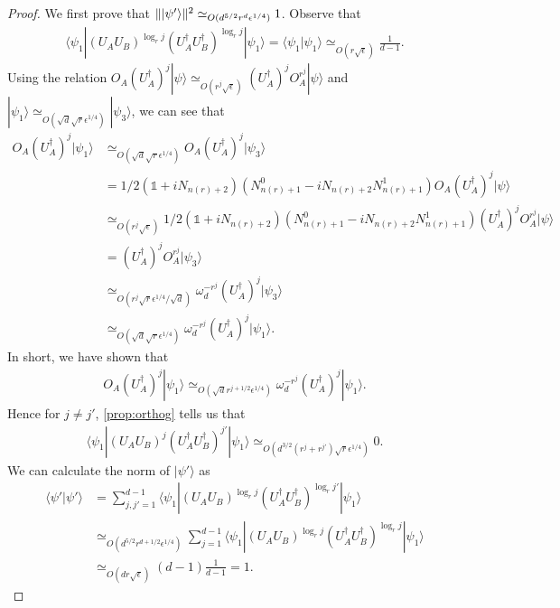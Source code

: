\documentclass[11pt,letterpaper]{article}
\newcommand{\ket}[1]{|#1\rangle}
\newcommand{\bra}[1]{\langle#1|}
\newcommand{\braket}[2]{\langle#1|#2\rangle}
\newcommand{\ct}{^{\dagger}}
\DeclarePairedDelimiter{\norm}{\lVert}{\rVert}
\newcommand{\1}{\mathbb{1}}
\newcommand{\nr}{n(r)}
\newcommand{\se}{\sqrt{\epsilon}}
\newcommand{\qe}{\epsilon^{1/4}}
\newcommand{\sd}{\sqrt{d}}
\newcommand{\sr}{\sqrt{r}}
\newcommand{\appd}[1]{\simeq_{#1}}
\theoremstyle{definition}
\begin{document}
\begin{proof}
	We first prove that $\norm{\ket{\psi'}}^2 \appd{O(d^{5/2} r^d \qe)} 1$.
	Observe that 
	\begin{align*}
		\bra{\psi_1} (U_AU_B)^{\log_r j} (U_A\ct U_B\ct)^{\log_r j}  \ket{\psi_1} =
		\braket{\psi_1}{\psi_1} \appd{O(r\se)} \frac{1}{d-1}.
	\end{align*}
	Using the relation $O_A(U_A\ct)^j \ket{\psi} \appd{O(r^j \se)} (U_A\ct)^j O_A^{r^j}\ket{\psi}$ and $\ket{\psi_1} \appd{O(\sd \sr \qe)} \ket{\psi_3}$,
        we can see that 
        \begin{align*}
            	O_A (U_A\ct)^j \ket{\psi_1} &\appd{O(\sd \sr \qe)} O_A(U_A\ct)^j \ket{\psi_3} \\
            	& = 1/2 (\1 + i N_{\nr+2})(N_{\nr+1}^0 - iN_{\nr+2}N_{\nr+1}^1) O_A (U_A\ct)^j \ket{\psi} \\
            	& \appd{O(r^j \se)} 1/2  (\1 + i N_{\nr+2})(N_{\nr+1}^0 - iN_{\nr+2}N_{\nr+1}^1)  (U_A\ct)^j O_A^{r^j} \ket{\psi} \\
            	& = (U_A\ct)^j O_A^{r^j} \ket{\psi_3} \\
            	& \appd{O(r^j \sr \qe/\sd)} \omega_d^{-r^j}(U_A\ct)^j \ket{\psi_3} \\
            	& \appd{O(\sd \sr\qe)} \omega_d^{-r^j}  (U_A\ct)^j \ket{\psi_1}.
        \end{align*}
        In short, we have shown that 
        \begin{align}
        \label{eq:omega}
        		O_A (U_A\ct)^j \ket{\psi_1} \appd{O(\sd r^{j+1/2} \qe)}\omega_d^{-r^j}  (U_A\ct)^j \ket{\psi_1}.
        \end{align}
	Hence for $j \neq j'$, \cref{prop:orthog} tells us that  
	\begin{align*}
		\bra{\psi_1} (U_AU_B)^{j} (U_A\ct U_B\ct)^{ j'} \ket{\psi_1} \appd{O(d^{3/2} (r^j + r^{j'})\sr \qe)} 0.
	\end{align*}
	We can calculate the norm of $\ket{\psi'}$ as 
	\begin{align*}
		\braket{\psi'}{\psi'} &=\sum_{j,j'=1}^{d-1} \bra{\psi_1} (U_AU_B)^{\log_r j} (U_A\ct U_B\ct)^{\log_r j'} \ket{\psi_1}\\
		&\appd{O(d^{5/2} r^{d+1/2} \qe)} \sum_{j=1}^{d-1} \bra{\psi_1} (U_AU_B)^{\log_r j} (U_A\ct U_B\ct)^{\log_r j} \ket{\psi_1}\\
		&\appd{O(dr\se)} (d-1) \frac{1}{d-1} = 1.
	\end{align*}
	

\end{proof}
\end{document}
